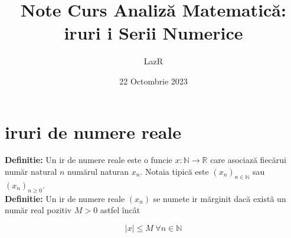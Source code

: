 \documentclass[12pt, letterpaper]{article}
\title{Note Curs Analiz\u{a} Matematic\u{a}: \cb{S}iruri \cb{s}i Serii Numerice}
\author{LazR}
\date{22 Octombrie 2023}
\begin{document}
\maketitle

\newpage

\section*{iruri de numere reale}

\textbf{Definitie:} Un ir de numere reale este o funcie $x : \mathbb{N} \rightarrow \mathbb{R}$ care
asociaz\u{a} fiec\u{a}rui num\u{a}r natural $n$ num\u{a}rul naturan $x_n$. Notaia tipic\u{a} este
$(x_n)_{n \in \mathbb{N}}$ sau $(x_n)_{n \geq 0}$.\\

\textbf{Definitie:} Un ir de numere reale $(x_n)$ se numete ir m\u{a}rginit dac\u{a}
exist\u{a} un num\u{a}r real pozitiv $M > 0$ astfel \^{i}nc\^{a}t

\[ |x| \leq M \hspace{3pt} \forall n \in \mathbb{N}  \]
\end{document}
